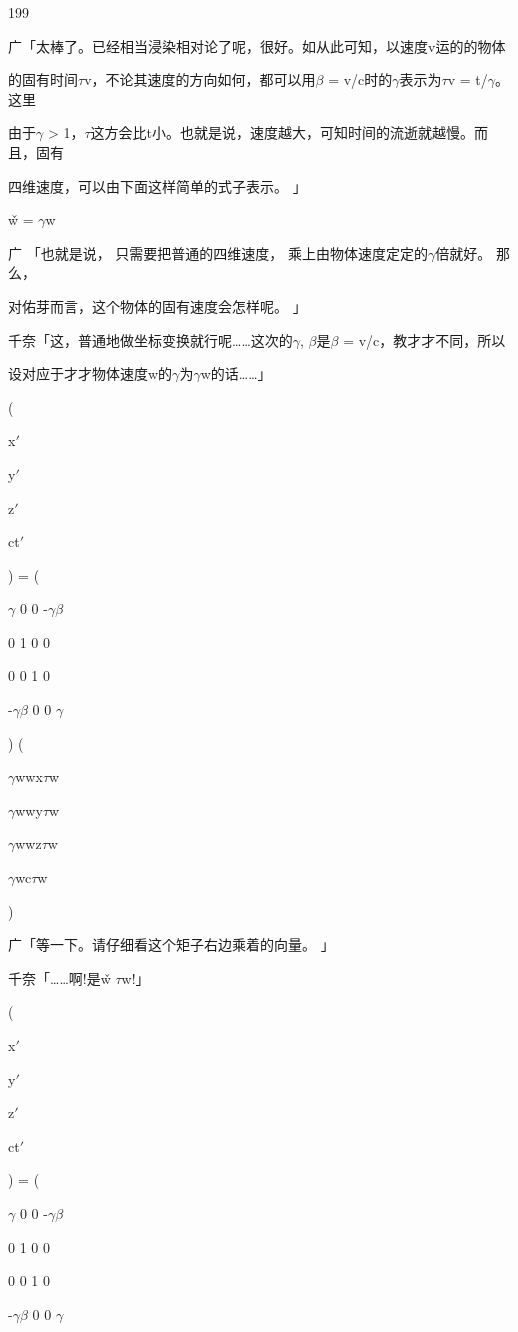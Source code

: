 199\par
广「太棒了。已经相当浸染相对论了呢，很好。如从此可知，以速度v运的的物体\par
的固有时间$\tau$v，不论其速度的方向如何，都可以用$\beta$ = v/c时的$\gamma$表示为$\tau$v = t/$\gamma$。这里\par
由于$\gamma$ > 1，$\tau$这方会比t小。也就是说，速度越大，可知时间的流逝就越慢。而且，固有\par
四维速度，可以由下面这样简单的式子表示。 」\par
w̌ = $\gamma$w\par
广 「也就是说， 只需要把普通的四维速度， 乘上由物体速度定定的$\gamma$倍就好。 那么，\par
对佑芽而言，这个物体的固有速度会怎样呢。 」\par
千奈「这，普通地做坐标变换就行呢……这次的$\gamma$, $\beta$是$\beta$ = v/c，教才才不同，所以\par
设对应于才才物体速度w的$\gamma$为$\gamma$w的话……」\par
(\par
x$\prime$\par
y$\prime$\par
z$\prime$\par
ct$\prime$\par
) = (\par
$\gamma$ 0 0 -$\gamma$$\beta$\par
0 1 0 0\par
0 0 1 0\par
-$\gamma$$\beta$ 0 0 $\gamma$\par
) (\par
$\gamma$wwx$\tau$w\par
$\gamma$wwy$\tau$w\par
$\gamma$wwz$\tau$w\par
$\gamma$wc$\tau$w\par
)\par
广「等一下。请仔细看这个矩子右边乘着的向量。 」\par
千奈「……啊!是w̌ $\tau$w!」\par
(\par
x$\prime$\par
y$\prime$\par
z$\prime$\par
ct$\prime$\par
) = (\par
$\gamma$ 0 0 -$\gamma$$\beta$\par
0 1 0 0\par
0 0 1 0\par
-$\gamma$$\beta$ 0 0 $\gamma$\par
